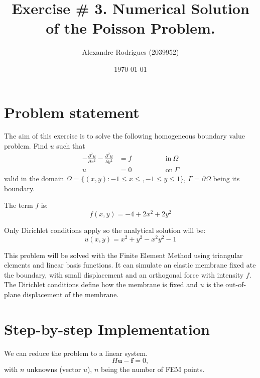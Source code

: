\documentclass[a4paper, 11pt]{article}
\begin{document}
	
	\title{Exercise \# 3. Numerical Solution of the Poisson Problem. }
	\author{{\small Alexandre Rodrigues (2039952)}}
	\date{\today}
	
	\maketitle
		\section{Problem statement}
			The aim of this exercise is to solve the following homogeneous boundary value problem.
			Find $u$ such that 
			\begin{align}
				-\frac{\partial^2 u}{\partial x^2} -\frac{\partial^2 u}{\partial y^2} &= f \qquad \qquad &\text{in} \ \Omega \\
				u &= 0 \qquad \qquad & \text{on} \ \Gamma
				\label{eq:prob}
			\end{align}
			valid in the domain $ \Omega = \{ (x,y) : -1 \le x \le , -1 \le y \le 1\} $, $\Gamma = \partial \Omega$ being its boundary.
			
			The term $f$ is:
			\begin{equation}
				f(x,y) = -4 + 2 x^2 + 2 y^2
				\label{eq:f}
			\end{equation}
		
			Only Dirichlet conditions apply so the analytical solution will be:
			\begin{equation}
				u(x,y) = x^2 + y^2 - x^2 y^2 -1
				\label{eq:analytic}
			\end{equation}
		
			This problem will be solved with the Finite Element Method using triangular elements and linear basis functions.
			It can simulate an elastic membrane fixed ate the boundary, with small displacement and an orthogonal force with intensity $ f $.
			The Dirichlet conditions define how the membrane is fixed and $u$ is the out-of-plane displacement of the membrane.
			
		
			\section{Step-by-step Implementation}
				We can reduce the problem to a linear system.
				\begin{equation}
					H \mathbf{u} - \mathbf{f} = 0,
				\end{equation}
				with $ n $ unknowns (vector $ u $), $ n $ being the number of FEM points.
			
\end{document}
